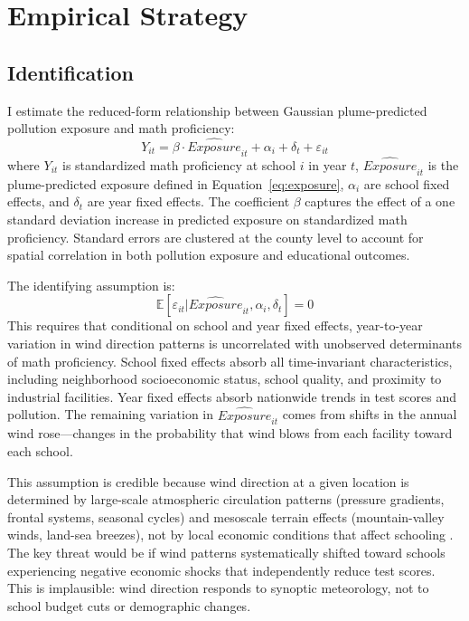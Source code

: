 \documentclass[12pt]{article}
\newcommand{\E}{\mathbb{E}}
\begin{document}
\section{Empirical Strategy}

\subsection{Identification}

I estimate the reduced-form relationship between Gaussian plume-predicted pollution exposure and math proficiency:
\begin{equation}
Y_{it} = \beta \cdot \widehat{Exposure}_{it} + \alpha_i + \delta_t + \varepsilon_{it}
\label{eq:main}
\end{equation}
where $Y_{it}$ is standardized math proficiency at school $i$ in year $t$, $\widehat{Exposure}_{it}$ is the plume-predicted exposure defined in Equation~\ref{eq:exposure}, $\alpha_i$ are school fixed effects, and $\delta_t$ are year fixed effects. The coefficient $\beta$ captures the effect of a one standard deviation increase in predicted exposure on standardized math proficiency. Standard errors are clustered at the county level to account for spatial correlation in both pollution exposure and educational outcomes.

The identifying assumption is:
\begin{equation}
\E[\varepsilon_{it} | \widehat{Exposure}_{it}, \alpha_i, \delta_t] = 0
\end{equation}
This requires that conditional on school and year fixed effects, year-to-year variation in wind direction patterns is uncorrelated with unobserved determinants of math proficiency. School fixed effects absorb all time-invariant characteristics, including neighborhood socioeconomic status, school quality, and proximity to industrial facilities. Year fixed effects absorb nationwide trends in test scores and pollution. The remaining variation in $\widehat{Exposure}_{it}$ comes from shifts in the annual wind rose---changes in the probability that wind blows from each facility toward each school.

This assumption is credible because wind direction at a given location is determined by large-scale atmospheric circulation patterns (pressure gradients, frontal systems, seasonal cycles) and mesoscale terrain effects (mountain-valley winds, land-sea breezes), not by local economic conditions that affect schooling \citep{deryugina2019, anderson2020}. The key threat would be if wind patterns systematically shifted toward schools experiencing negative economic shocks that independently reduce test scores. This is implausible: wind direction responds to synoptic meteorology, not to school budget cuts or demographic changes.
\end{document}
